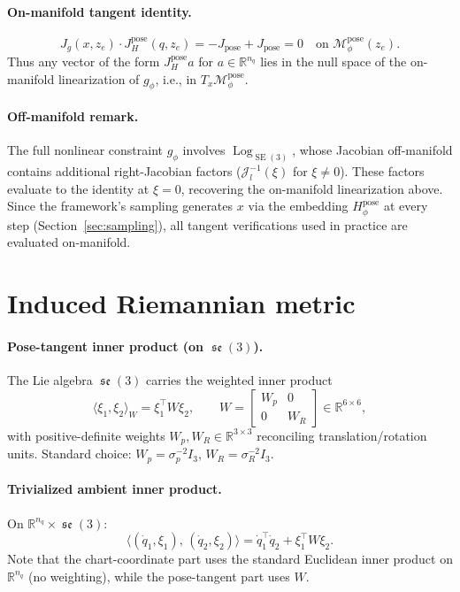 \documentclass[11pt,a4paper]{article}
\DeclareMathOperator{\Log}{Log}
\DeclareMathOperator{\SE}{SE}
\DeclareMathOperator{\se}{\mathfrak{se}}
\newcommand{\R}{\mathbb{R}}
\newcommand{\Mpose}{\mathcal{M}_\phi^{\text{pose}}}
\newcommand{\Hpose}{H_\phi^{\text{pose}}}
\newcommand{\Jpose}{J_{\text{pose}}}
\begin{document}
\paragraph{On-manifold tangent identity.}
\begin{equation}
\boxed{ J_g(x, z_e) \cdot J_H^{\text{pose}}(q, z_e) = -\Jpose + \Jpose = 0 \quad \text{on } \Mpose(z_e). }
\end{equation}
Thus any vector of the form $J_H^{\text{pose}} a$ for $a \in \R^{n_q}$ lies in the null space of the on-manifold linearization of $g_\phi$, i.e., in $T_x \Mpose$.

\paragraph{Off-manifold remark.} The full nonlinear constraint $g_\phi$ involves $\Log_{\SE(3)}$, whose Jacobian off-manifold contains additional right-Jacobian factors ($\mathcal{J}_l^{-1}(\xi)$ for $\xi \neq 0$). These factors evaluate to the identity at $\xi = 0$, recovering the on-manifold linearization above. Since the framework's sampling generates $x$ via the embedding $\Hpose$ at every step (Section~\ref{sec:sampling}), all tangent verifications used in practice are evaluated on-manifold.

\section{Induced Riemannian metric}

\paragraph{Pose-tangent inner product (on $\se(3)$).} The Lie algebra $\se(3)$ carries the weighted inner product
\begin{equation}
\langle \xi_1, \xi_2 \rangle_W = \xi_1^\top W \xi_2, \qquad W = \begin{bmatrix} W_p & 0 \\ 0 & W_R \end{bmatrix} \in \R^{6 \times 6},
\end{equation}
with positive-definite weights $W_p, W_R \in \R^{3 \times 3}$ reconciling translation/rotation units. Standard choice: $W_p = \sigma_p^{-2} I_3$, $W_R = \sigma_R^{-2} I_3$.

\paragraph{Trivialized ambient inner product.} On $\R^{n_q} \times \se(3)$:
\begin{equation}
\bigl\langle (\dot q_1, \xi_1), \, (\dot q_2, \xi_2) \bigr\rangle = \dot q_1^\top \dot q_2 + \xi_1^\top W \xi_2.
\end{equation}
Note that the chart-coordinate part uses the standard Euclidean inner product on $\R^{n_q}$ (no weighting), while the pose-tangent part uses $W$.
\end{document}
